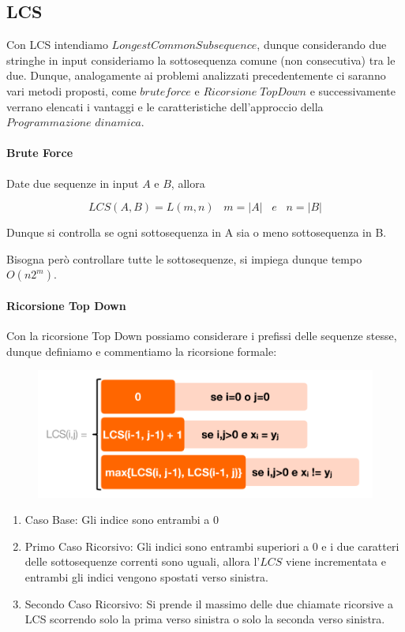 \documentclass{article}
\begin{document}
\newpage

\subsection{LCS} Con LCS intendiamo \(Longest Common Subsequence\), dunque considerando due stringhe in input consideriamo la sottosequenza comune (non consecutiva) tra le due. Dunque, analogamente ai problemi analizzati precedentemente ci saranno vari metodi proposti, come \(brute force\) e $Ricorsione \; Top Down$ e successivamente verrano elencati i vantaggi e le caratteristiche dell'approccio della $Programmazione$ $dinamica$.

\paragraph{Brute Force} Date due sequenze in input $A$ e $B$, allora

\begin{equation}
    LCS(A,B) = L(m,n) \; \; \; m = |A| \; \; \; e \; \; \; n = |B|
\end{equation}

Dunque si controlla se ogni sottosequenza in A sia o meno sottosequenza in B.

Bisogna però controllare tutte le sottosequenze, si impiega dunque tempo $O(n2^{m})$.

\paragraph{Ricorsione Top Down} Con la ricorsione Top Down possiamo considerare i prefissi delle sequenze stesse, dunque definiamo e commentiamo la ricorsione formale:

    \begin{figure}[htbp]
        \center
        \includegraphics[scale=0.45]{img/LCS1.png}
    \end{figure}

\begin{enumerate}
    \item Caso Base: Gli indice sono entrambi a 0
    \item Primo Caso Ricorsivo: Gli indici sono entrambi superiori a 0 e i due caratteri delle sottosequenze correnti sono uguali, allora l'$LCS$ viene incrementata e entrambi gli indici vengono spostati verso sinistra.
    \item Secondo Caso Ricorsivo: Si prende il massimo delle due chiamate ricorsive a LCS scorrendo solo la prima verso sinistra o solo la seconda verso sinistra.
\end{enumerate}
\end{document}
